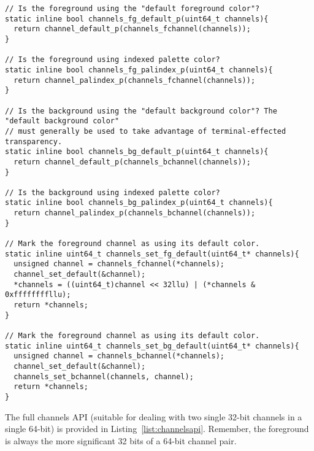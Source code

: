 \begin{verbatim}
// Is the foreground using the "default foreground color"?
static inline bool channels_fg_default_p(uint64_t channels){
  return channel_default_p(channels_fchannel(channels));
}

// Is the foreground using indexed palette color?
static inline bool channels_fg_palindex_p(uint64_t channels){
  return channel_palindex_p(channels_fchannel(channels));
}

// Is the background using the "default background color"? The "default background color"
// must generally be used to take advantage of terminal-effected transparency.
static inline bool channels_bg_default_p(uint64_t channels){
  return channel_default_p(channels_bchannel(channels));
}

// Is the background using indexed palette color?
static inline bool channels_bg_palindex_p(uint64_t channels){
  return channel_palindex_p(channels_bchannel(channels));
}

// Mark the foreground channel as using its default color.
static inline uint64_t channels_set_fg_default(uint64_t* channels){
  unsigned channel = channels_fchannel(*channels);
  channel_set_default(&channel);
  *channels = ((uint64_t)channel << 32llu) | (*channels & 0xffffffffllu);
  return *channels;
}

// Mark the foreground channel as using its default color.
static inline uint64_t channels_set_bg_default(uint64_t* channels){
  unsigned channel = channels_bchannel(*channels);
  channel_set_default(&channel);
  channels_set_bchannel(channels, channel);
  return *channels;
}
\end{verbatim}
\label{list:channelsapi}
\egroup

The full channels API (suitable for dealing with two single 32-bit channels in
a single 64-bit) is provided in Listing~\ref{list:channelsapi}. Remember, the
foreground is always the more significant 32 bits of a 64-bit channel pair.

